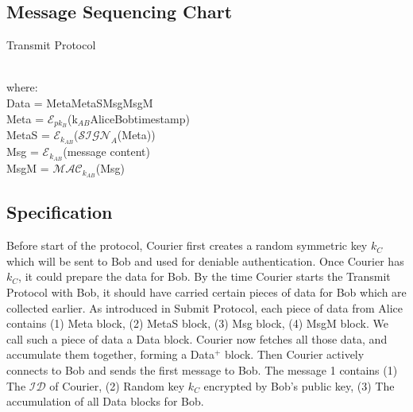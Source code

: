 \subsection{Message Sequencing Chart}
\begin{msc}{Transmit Protocol}
\setlength{\instdist}{3\instdist}
\setlength{\envinstdist}{1.8\envinstdist}
\setlength{\levelheight}{1.5\levelheight}

\nextlevel[4]
\nextlevel
{}
\nextlevel[2]
\nextlevel
{}
\nextlevel
\end{msc}
\\
where: \\
Data = Meta\textbar\textbar MetaS\textbar\textbar Msg\textbar\textbar MsgM\\
Meta = $\mathcal{E}_{pk_B}$(k$_{AB}$\textbar\textbar Alice\textbar\textbar Bob\textbar\textbar timestamp)\\
MetaS = $\mathcal{E}_{k_{AB}}$($\mathcal{SIGN}_A$(Meta))\\
Msg = $\mathcal{E}_{k_{AB}}$(message content)\\
MsgM = $\mathcal{MAC}_{k_{AB}}$(Msg)

\subsection{Specification}
Before start of the protocol, Courier first creates a random symmetric key $k_C$ which will be sent to Bob and used for deniable authentication. Once Courier has $ k_C $, it could prepare the data for Bob. By the time Courier starts the Transmit Protocol with Bob, it should have carried certain pieces of data for Bob which are collected earlier.  As introduced in Submit Protocol, each piece of data from Alice contains (1) Meta block, (2) MetaS block, (3) Msg block, (4) MsgM block. We call such a piece of data a Data block. Courier now fetches all those data, and accumulate them together, forming a Data$^+$ block. Then Courier actively connects to Bob and sends the first message to Bob. The message 1 contains (1) The $\mathcal{ID}$ of Courier, (2) Random key $ k_C $ encrypted by Bob's public key, (3) The accumulation of all Data blocks for Bob.

